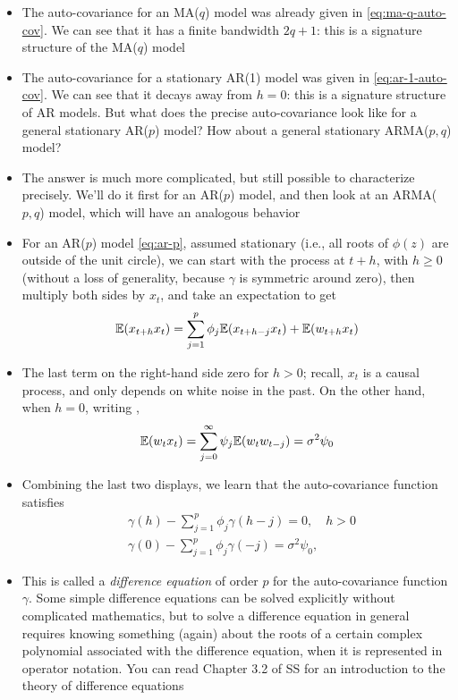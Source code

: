 \documentclass{article}
\begin{document}
\begin{itemize}
\item The auto-covariance for an MA($q$) model was already given in
  \eqref{eq:ma-q-auto-cov}. We can see that it has a finite bandwidth $2q+1$:
  this is a signature structure of the MA($q$) model

\item The auto-covariance for a stationary AR(1) model was given in 
  \eqref{eq:ar-1-auto-cov}. We can see that it decays away from $h=0$: this is
  a signature structure of AR models. But what does the precise auto-covariance
  look like for a general stationary AR($p$) model? How about a general
  stationary ARMA($p,q$) model? 

\item The answer is much more complicated, but still possible to characterize
  precisely. We'll do it first for an AR($p$) model, and then look at an
  ARMA($p,q$) model, which will have an analogous behavior 

\item For an AR($p$) model \eqref{eq:ar-p}, assumed stationary (i.e., all roots
  of $\phi(z)$ are outside of the unit circle), we can start with the process at
  $t+h$, with $h \geq 0$ (without a loss of generality, because $\gamma$ is 
  symmetric around zero), then multiply both sides by $x_t$, and take an
  expectation to get     
  \[
  \mathbb{E}(x_{t+h} x_t) = \sum_{j=1}^p \phi_j \mathbb{E}(x_{t+h-j} x_t) + \mathbb{E}(w_{t+h} x_t)  
  \]

\item The last term on the right-hand side zero for $h>0$; recall, $x_t$ is a  
  causal process, and only depends on white noise in the past. On the other
  hand, when $h=0$, writing , 
  \[
  \mathbb{E}(w_t x_t) = \sum_{j=0}^\infty \psi_j \mathbb{E}(w_t w_{t-j}) =  \sigma^2 \psi_0  
  \]

\item Combining the last two displays, we learn that the auto-covariance
  function satisfies 
  \begin{align*}
  &\gamma(h) - \sum_{j=1}^p \phi_j \gamma(h-j) = 0, \quad h > 0 \\ 
  &\gamma(0) - \sum_{j=1}^p \phi_j \gamma(-j) = \sigma^2 \psi_0, 
  \end{align*}

\item This is called a \emph{difference equation} of order $p$ for the
  auto-covariance function $\gamma$. Some simple difference equations can be
  solved explicitly without complicated mathematics, but to solve a difference  
  equation in general requires knowing something (again) about the roots of a
  certain complex polynomial associated with the difference equation, when it is
  represented in operator notation. You can read Chapter 3.2 of SS for an
  introduction to the theory of difference equations


\end{itemize}
\end{document}
